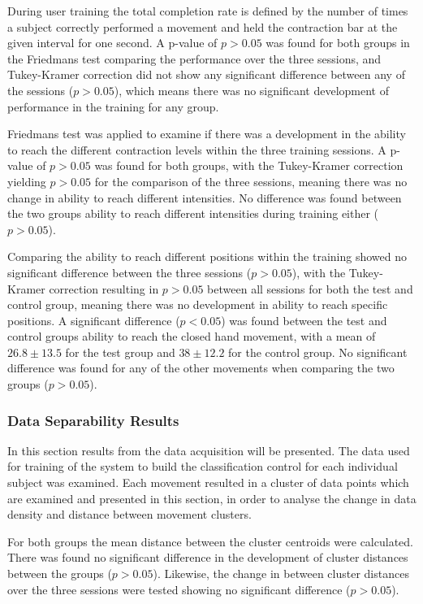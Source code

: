 During user training the total completion rate is defined by the number of times a subject correctly performed a movement and held the contraction bar at the given interval for one second. A p-value of $p > 0.05$ was found for both groups in the Friedmans test comparing the performance over the three sessions, and Tukey-Kramer correction did not show any significant difference between any of the sessions ($p > 0.05$), which means there was no significant development of performance in the training for any group. 

Friedmans test was applied to examine if there was a development in the ability to reach the different contraction levels within the three training sessions. A p-value of $p > 0.05$ was found for both groups, with the Tukey-Kramer correction yielding $p > 0.05$ for the comparison of the three sessions, meaning there was no change in ability to reach different intensities. No difference was found between the two groups ability to reach different intensities during training either ($p > 0.05$).

Comparing the ability to reach different positions within the training showed no significant difference between the three sessions ($p > 0.05$), with the Tukey-Kramer correction resulting in $p > 0.05$ between all sessions for both the test and control group, meaning there was no development in ability to reach specific positions. A significant difference ($p < 0.05$) was found between the test and control groups ability to reach the closed hand movement, with a mean of $26.8 \pm13.5$ for the test group and $38 \pm12.2$ for the control group. No significant difference was found for any of the other movements when comparing the two groups ($p > 0.05$).

\subsubsection*{Data Separability Results}
In this section results from the data acquisition will be presented. The data used for training of the system to build the classification control for each individual subject was examined. Each movement resulted in a cluster of data points which are examined and presented in this section, in order to analyse the change in data density and distance between movement clusters.

For both groups the mean distance between the cluster centroids were calculated. There was found no significant difference in the development of cluster distances between the groups ($p > 0.05$). Likewise, the change in between cluster distances over the three sessions were tested showing no significant difference ($p > 0.05$).

